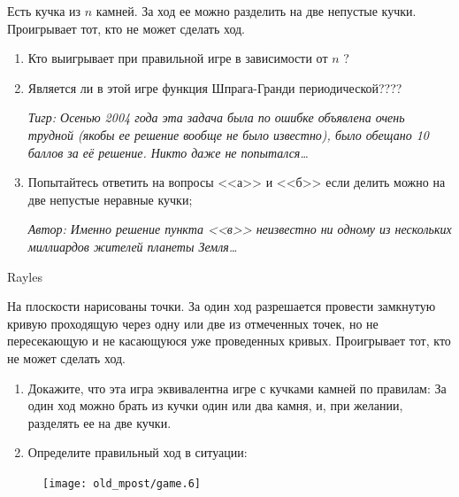 \begin{problem}
Есть кучка из  $n$  камней. За ход ее можно разделить на две непустые кучки. Проигрывает тот, кто не может сделать ход. \par
\begin{enumerate}
\item 	Кто выигрывает при правильной игре в зависимости от  $n$ ?\par
\item 	Является ли в этой игре функция Шпрага-Гранди периодической????\par
{\it Тигр: Осенью 2004 года эта задача была по ошибке объявлена очень трудной (якобы ее решение вообще не было известно), было обещано 10 баллов за её решение. Никто даже не попытался\ldots }\par
\item 	Попытайтесь ответить на вопросы <<а>> и <<б>> если делить можно на две непустые неравные кучки;\par
{\it Автор: Именно решение пункта <<в>> неизвестно ни одному из нескольких миллиардов жителей планеты Земля\ldots }\par
\end{enumerate}


\begin{sol}

\end{sol}
\end{problem}





\begin{problem}
\begin{source} Rayles\end{source}
 \label{Rayles}
На плоскости нарисованы точки. За один ход разрешается провести замкнутую кривую проходящую через одну или две из отмеченных точек, но не пересекающую и не касающуюся уже проведенных кривых. Проигрывает тот, кто не может сделать ход.\par
\begin{enumerate}
\item 	Докажите, что эта игра эквивалентна игре с кучками камней по правилам: За один ход можно брать из кучки один или два камня, и, при желании, разделять ее на две кучки.\par
\item 	Определите правильный ход в ситуации:\par
\end{enumerate}
\begin{figure}[htbp]
     \texttt{[image: old\_mpost/game.6]}
\end{figure}


\begin{sol}

\end{sol}
\end{problem}

